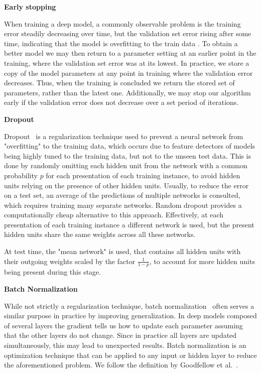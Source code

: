 \textbf{Early stopping}\par
When training a deep model, a commonly observable problem is the training error steadily decreasing over time, but the validation set error rising after some time, indicating that the model is overfitting to the train data \cite{Goodfellow-et-al-2016}. To obtain a better model we may then return to a parameter setting at an earlier point in the training, where the validation set error was at its lowest. In practice, we store a copy of the model parameters at any point in training where the validation error decreases. Thus, when the training is concluded we return the stored set of parameters, rather than the latest one. Additionally, we may stop our algorithm early if the validation error does not decrease over a set period of iterations.\bigskip

\textbf{Dropout}\par
Dropout~\cite{hinton2012improving} is a regularization technique used to prevent a neural network from "overfitting" to the training data, which occurs due to feature detectors of models being highly tuned to the training data, but not to the unseen test data. This is done by randomly omitting each hidden unit from the network with a common probability $p$ for each presentation of each training instance, to avoid hidden units relying on the presence of other hidden units. Usually, to reduce the error on a test set, an average of the predictions of multiple networks is consulted, which requires training many separate networks. Random dropout provides a computationally cheap alternative to this approach. Effectively, at each presentation of each training instance a different network is used, but the present hidden units share the same weights across all these networks.

At test time, the "mean network" is used, that contains all hidden units with their outgoing weights scaled by the factor $\frac{1}{1-p}$, to account for more hidden units being present during this stage. \bigskip

\textbf{Batch Normalization}\par
While not strictly a regularization technique, batch normalization~\cite{ioffe2015batch} often serves a similar purpose in practice by improving generalization.
In deep models composed of several layers the gradient tells us how to update each parameter assuming that the other layers do not change. Since in practice all layers are updated simultaneously, this may lead to unexpected results. Batch normalization is an optimization technique that can be applied to any input or hidden layer to reduce the aforementioned problem. We follow the definition by Goodfellow et al.~\cite{Goodfellow-et-al-2016}.

